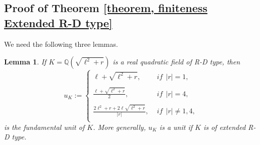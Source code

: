 \documentclass[12pt]{amsart}
\newtheorem{lemma}[theorem]{Lemma}
\theoremstyle{definition}
\numberwithin{equation}{section}
\begin{document}
\subsection{Proof of Theorem \ref{theorem, finiteness Extended R-D type}} 
We need the following three lemmas. 
\begin{lemma}  \label{lemma, Degert}
If $K=\mathbb{Q}(\sqrt{\ell^2+r})$ is a real quadratic field of R-D type, then
	\begin{equation} \label{equation, f.u of R-D type} 
	u_K :=	\left\{
	\begin{array}{ll}
		\ell + \sqrt{\ell^2+r}, \, \, & \textit{if} ~~ |r|= 1,\\
		& \\
		\frac{	\ell + \sqrt{\ell^2+r}}{2}, \, \, & \textit{if} ~~ |r|= 4,\\
		& \\
		\frac{	2\ell^2+r + 2 \ell \sqrt{\ell^2+r}}{|r|}, \, \,  & \textit{if} ~~ |r|\neq 1,4,\\
	\end{array}
	\right.
\end{equation}
is the fundamental unit of $K$. More generally, $u_K$ is a unit if $K$ is of extended R-D type.
\end{lemma}
\end{document}
